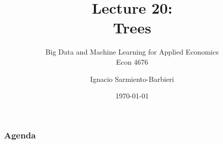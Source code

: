 \documentclass[
  shownotes,
  xcolor={svgnames},
  hyperref={colorlinks,citecolor=DarkBlue,linkcolor=DarkRed,urlcolor=DarkBlue}
  , aspectratio=169]{beamer}
\begin{document}
 
\title[Lecture 20]{Lecture 20: \\ Trees}
\subtitle{Big Data and Machine Learning for Applied Economics \\ Econ 4676}
\date{\today}

\author[Sarmiento-Barbieri]{Ignacio Sarmiento-Barbieri}


\begin{frame}[noframenumbering]
\maketitle
\end{frame}


\begin{frame}
\frametitle{Agenda}

\tableofcontents

\end{frame}

\end{document}

